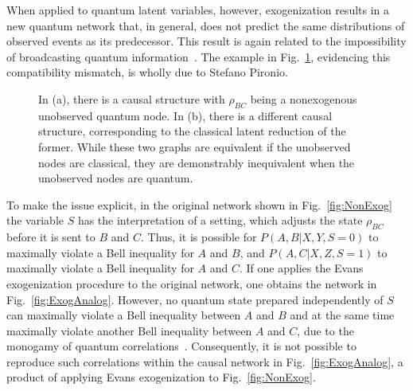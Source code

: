 \documentclass[superscriptaddress,aps,prx,nofootinbib,twocolumn,twoside,reprint,letterpaper,longbibliography]{revtex4-2}
\begin{document}
When applied to quantum latent variables, however, exogenization results in a new quantum network that, in general, does not predict the same distributions of observed events as its predecessor.
This result is again related to the impossibility of broadcasting quantum information~\cite{NoCloningGeneral2006}. The example in Fig.~\ref{fig:Exog}, evidencing this compatibility mismatch, is wholly due to Stefano Pironio.

\begin{figure}[!b]
  \begin{center}
    \hfill
    \hfill
    \hfill
  \end{center}
  \caption[]{In (a), there is a causal structure with $\rho_{BC}$ being a nonexogenous unobserved quantum node. In (b), there is a different causal structure, corresponding to the classical latent reduction of the former. While these two graphs are equivalent if the unobserved nodes are classical, they are demonstrably inequivalent when the unobserved nodes are quantum.}
  \label{fig:Exog}
\end{figure}

To make the issue explicit, in the original network shown in Fig.~\ref{fig:NonExog} the variable $S$ has the interpretation of a setting, which adjusts the state $\rho_{BC}$ before it is sent to $B$ and $C$.
Thus, it is possible for ${P(A,B|X,Y,S{=}0)}$ to maximally violate a Bell inequality for $A$ and $B$, and ${P(A,C|X,Z,S{=}1)}$ to maximally violate a Bell inequality for $A$ and $C$.
If one applies the Evans exogenization procedure to the original network, one obtains the network in Fig.~\ref{fig:ExogAnalog}. However, no quantum state prepared independently of $S$ can maximally violate a Bell inequality between $A$ and $B$ and at the same time maximally violate another Bell inequality between $A$ and $C$, due to the monogamy of quantum correlations~\cite{Toner2009,Seevinck2010}.
Consequently, it is not possible to reproduce such correlations within the causal network in Fig.~\ref{fig:ExogAnalog}, a product of applying Evans exogenization to Fig.~\ref{fig:NonExog}.
\end{document}

